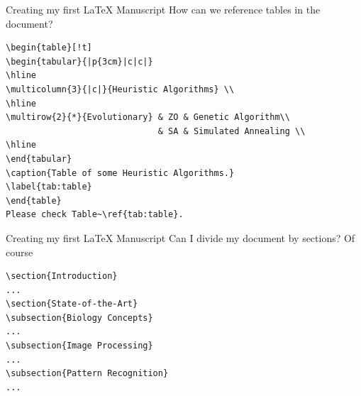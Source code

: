 \begin{frame}[fragile]{Creating my first \LaTeX{} Manuscript}
How can we reference tables in the document?
\footnotesize
\begin{verbatim}
\begin{table}[!t]
\begin{tabular}{|p{3cm}|c|c|}
\hline
\multicolumn{3}{|c|}{Heuristic Algorithms} \\
\hline
\multirow{2}{*}{Evolutionary} & ZO & Genetic Algorithm\\ 
                              & SA & Simulated Annealing \\ 
\hline
\end{tabular}
\caption{Table of some Heuristic Algorithms.}
\label{tab:table}
\end{table}
Please check Table~\ref{tab:table}.
\end{verbatim}
\end{frame}

\begin{frame}[fragile]{Creating my first \LaTeX{} Manuscript}
Can I divide my document by sections? Of course
\footnotesize
\begin{verbatim}
\section{Introduction}
...
\section{State-of-the-Art}
\subsection{Biology Concepts}
...
\subsection{Image Processing}
...
\subsection{Pattern Recognition}
...
\end{verbatim}
\end{frame}


